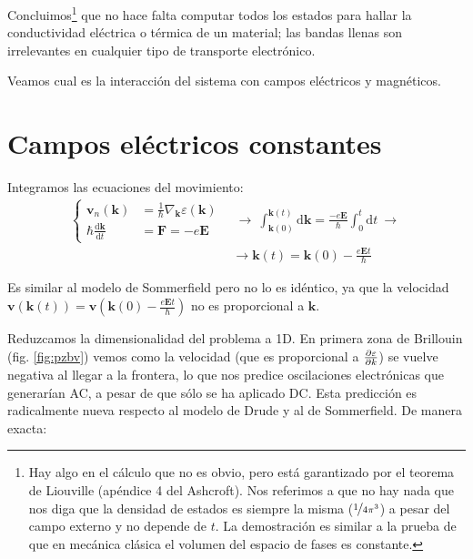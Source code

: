 Concluimos\footnote{Hay algo en el cálculo que no es obvio, pero está
  garantizado por el teorema de Liouville (apéndice 4 del
  Ashcroft). Nos referimos a que no hay nada que nos diga que la
  densidad de estados es siempre la misma ($\nicefrac{1}{4\pi^3}$) a
  pesar del campo externo y no depende de $t$. La demostración es
  similar a la prueba de que en mecánica clásica el volumen del
  espacio de fases es constante.} que no hace falta computar todos los estados para hallar la
conductividad eléctrica o térmica de un material; las bandas llenas
son irrelevantes en cualquier tipo de transporte electrónico.

Veamos cual es la interacción del sistema con campos eléctricos y magnéticos.

\section{Campos eléctricos constantes}
Integramos las ecuaciones del movimiento:
\begin{equation}
  \begin{split}
    \begin{cases}
      \mathbf{v}_n (\mathbf{k}) &= \frac{1}{\hbar}
      \nabla_\mathbf{k}\varepsilon(\mathbf{k}) \\
      \hbar \frac{\text{d}\mathbf{k}}{\text{d}t} &= \mathbf{F} = -e
      \mathbf{E}
    \end{cases}
    &\ \rightarrow \ \int_{\mathbf{k}(0)}^{\mathbf{k}(t)}
    \text{d}\mathbf{k} = \frac{-e \mathbf{E}}{\hbar} \int_0^t
    \text{d}t \ \rightarrow \  \\ & \rightarrow  \boxed{\mathbf{k}(t) = \mathbf{k}(0) -
      \frac{e \mathbf{E}t}{\hbar}}
  \end{split}
\end{equation}

Es similar al modelo de Sommerfield pero no lo es idéntico, ya que la
velocidad $\mathbf{v}(\mathbf{k}(t)) = \mathbf{v}(\mathbf{k}(0) -
\frac{e \mathbf{E}t}{\hbar})$ no es proporcional a $\mathbf{k}$.

Reduzcamos la dimensionalidad del problema a 1D. En primera zona de
Brillouin (fig. \ref{fig:pzbv}) vemos como la velocidad (que es
proporcional a $\frac{\partial \varepsilon}{\partial k}$) se vuelve negativa al llegar
a la frontera, lo que nos predice oscilaciones electrónicas que
generarían AC, a pesar de que sólo se ha aplicado DC. Esta predicción
es radicalmente nueva respecto al modelo de Drude y al de
Sommerfield. De manera exacta:

